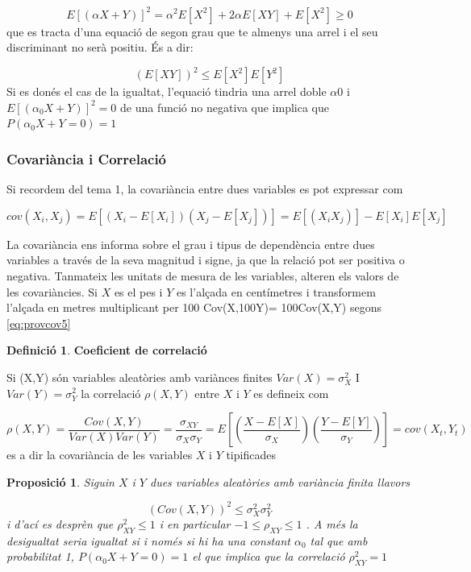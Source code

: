 \documentclass[
  catalan,
]{article}
\newtheorem{proposition}{Proposició}[section]
\theoremstyle{definition}
\newtheorem{definition}{Definició}[section]
\theoremstyle{definition}
\theoremstyle{definition}
\theoremstyle{definition}
\theoremstyle{remark}
\begin{document}
\[
E[(\alpha X+Y)]^2 =\alpha^2 E[X^2] +2 \alpha E[XY]+E[X^2] \geq 0
\]
que es tracta d'una equació de segon grau que te almenys una arrel i el seu discriminant no serà positiu. És a dir:

\[
(E[XY])^2\leq E[X^2] E[Y^2]
\]
Si es donés el cas de la igualtat, l'equació tindria una arrel doble \(\alpha0\) i \(E[(\alpha_0 X+Y)]^2=0\) de una funció no negativa que implica que \(P(\alpha_0 X+Y=0)=1\)

\subsubsection{Covariància i Correlació}\label{covariuxe0ncia-i-correlaciuxf3}

Si recordem del tema 1, la covariància entre dues variables es pot expressar com

\[
cov(X_i,X_j)=E[(X_i-E[X_i])(X_j-E[X_j])]=E[(X_iX_j)]-E[X_i]E[X_j] 
\]

La covariància ens informa sobre el grau i tipus de dependència entre dues variables a través de la seva magnitud i signe, ja que la relació pot ser positiva o negativa. Tanmateix les unitats de mesura de les variables, alteren els valors de les covariàncies. Si \(X\) es el pes i \(Y\) es l'alçada en centímetres i transformem l'alçada en metres multiplicant per 100 Cov(X,100Y)= 100Cov(X,Y) segons \eqref{eq:provcov5}

\begin{definition}
\textbf{Coeficient de correlació}

Si (X,Y) són variables aleatòries amb variànces finites \(Var(X)=\sigma_X^2\) I \(Var(Y)=\sigma_Y^2\) la correlació \(\rho(X,Y)\) entre \(X\) i \(Y\) es defineix com

\[
\rho(X,Y)=\dfrac{Cov(X,Y)}{Var(X)Var(Y)}= \dfrac{\sigma_{XY}}{\sigma_X \sigma_Y} = E \left[\left(\dfrac{X-E[X]}{\sigma_X}\right)\left(\dfrac{Y-E[Y]}{\sigma_Y}\right)\right]= cov(X_t,Y_t)
\]
es a dir la covariància de les variables \(X\) i \(Y\) tipificades
\end{definition}

\begin{proposition}
Siguin \(X\) i \(Y\) dues variables aleatòries amb variància finita llavors

\[
(Cov(X,Y))^2 \leq \sigma_X^2 \sigma_Y^2
\]
i d'ací es desprèn que \(\rho^2_{XY} \leq 1\) i en particular \(-1 \leq \rho_{XY} \leq 1\) . A més la desigualtat seria igualtat si i només si hi ha una constant \(\alpha_0\) tal que amb probabilitat 1, \(P(\alpha_0 X+Y=0)=1\) el que implica que la correlació \(\rho_{XY}^2=1\)
\end{proposition}
\end{document}
